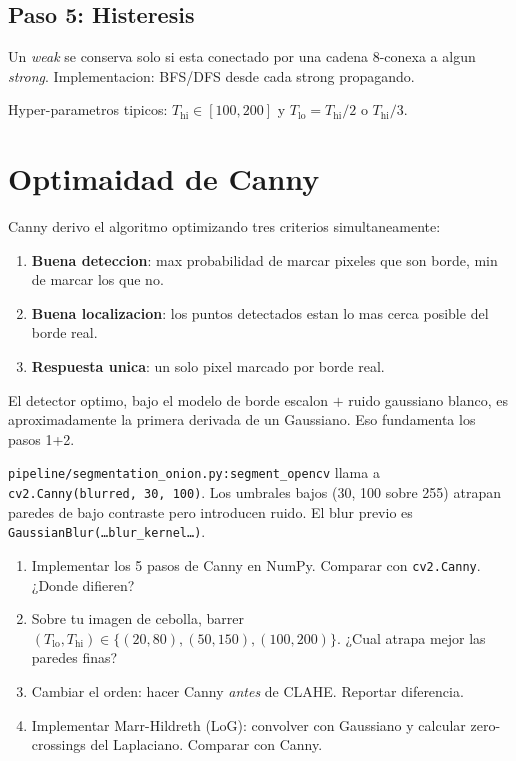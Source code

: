 \documentclass[11pt,a4paper,twoside,openright]{book}
\begin{document}
\subsection{Paso 5: Histeresis}
Un \emph{weak} se conserva solo si esta conectado por una cadena 8-conexa a algun \emph{strong}. Implementacion: BFS/DFS desde cada strong propagando.

Hyper-parametros tipicos: $T_{\text{hi}} \in [100, 200]$ y $T_{\text{lo}} = T_{\text{hi}} / 2$ o $T_{\text{hi}}/3$.

\section{Optimaidad de Canny}

Canny derivo el algoritmo optimizando tres criterios simultaneamente:

\begin{enumerate}[leftmargin=2em]
  \item \textbf{Buena deteccion}: max probabilidad de marcar pixeles que son borde, min de marcar los que no.
  \item \textbf{Buena localizacion}: los puntos detectados estan lo mas cerca posible del borde real.
  \item \textbf{Respuesta unica}: un solo pixel marcado por borde real.
\end{enumerate}

El detector optimo, bajo el modelo de borde escalon $+$ ruido gaussiano blanco, es aproximadamente la primera derivada de un Gaussiano. Eso fundamenta los pasos 1+2.

\begin{pipeline}
\texttt{pipeline/segmentation\_onion.py:segment\_opencv} llama a \texttt{cv2.Canny(blurred, 30, 100)}. Los umbrales bajos (30, 100 sobre 255) atrapan paredes de bajo contraste pero introducen ruido. El blur previo es \texttt{GaussianBlur(\dots blur\_kernel\dots)}.
\end{pipeline}

\begin{ejercicio}
\begin{enumerate}[leftmargin=2em]
  \item Implementar los 5 pasos de Canny en NumPy. Comparar con \texttt{cv2.Canny}. ¿Donde difieren?
  \item Sobre tu imagen de cebolla, barrer $(T_{\text{lo}}, T_{\text{hi}}) \in \{(20,80), (50,150), (100,200)\}$. ¿Cual atrapa mejor las paredes finas?
  \item Cambiar el orden: hacer Canny \emph{antes} de CLAHE. Reportar diferencia.
  \item Implementar Marr-Hildreth (LoG): convolver con Gaussiano y calcular zero-crossings del Laplaciano. Comparar con Canny.
\end{enumerate}
\end{ejercicio}
\end{document}

